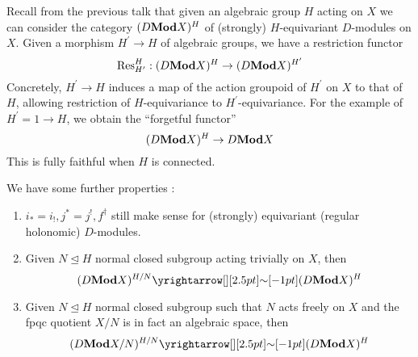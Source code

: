 \documentclass{article}
\begin{document}
Recall from the previous talk that
given an algebraic group $H$ acting on $X$
we can consider the category $(D\mathbf{Mod} X)^H$ 
of (strongly) $H$-equivariant $D$-modules on $X$.
Given a morphism $H^\prime \to H$ of algebraic groups,
we have a restriction functor 
\[
  \mathrm{Res}^{H}_{H^\prime} : (D\mathbf{Mod} X)^{H} \to (D\mathbf{Mod} X)^{H^\prime}
\]
Concretely, 
$H^\prime \to H$ induces a map of the action groupoid of $H^\prime$ on $X$
to that of $H$, allowing restriction of $H$-equivariance
to $H^\prime$-equivariance.
For the example of $H^\prime = 1 \to H$,
we obtain the ``forgetful functor''
\[
  (D\mathbf{Mod} X)^H \to D\mathbf{Mod} X
\]
This is fully faithful when $H$ is connected.
\cite[Lem. A.1.2]{Zhu-16}

We have some further properties : 
\begin{enumerate}
  \item $i_* = i_! , j^* = j^! , f^\dagger$ still make sense 
  for (strongly) equivariant (regular holonomic) $D$-modules.
  \item
  Given $N \trianglelefteq H$ normal closed subgroup
  acting trivially on $X$,
  then 
  \[
    (D\MOD X)^{H / N} \map{\sim}{} (D\MOD X)^H
  \]
  \item Given $N \trianglelefteq H$ normal closed subgroup
  such that $N$ acts freely on $X$ and the fpqc quotient $X / N$
  is in fact an algebraic space,
  then 
  \[
    (D\MOD X / N)^{H / N} \map{\sim}{} (D\MOD X)^H
  \]

\end{enumerate}
\end{document}
